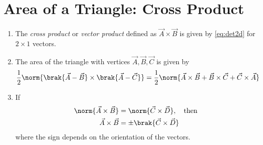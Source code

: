\section{Area of a Triangle: Cross Product}
\begin{enumerate}[label=\thesection.\arabic*.,ref=\thesection.\theenumi]
\item The {\em cross product} or {\em vector product} defined as $\vec{A}\times \vec{B}$ is given by  
  \eqref{eq:det2d} for  $2 \times 1$ vectors.
\item The area of the triangle with vertices $\vec{A}, \vec{B}, \vec{C}$ is given by 
	\label{prop:area2d}
\begin{align}
  \label{eq:area2d}
	\frac{1}{2}\norm{\brak{\vec{A}-\vec{B}} \times \brak{\vec{A}-\vec{C}}}
 = 
 \frac{1}{2}\norm{\vec{A} \times \vec{B}+\vec{B} \times \vec{C}+\vec{C} \times \vec{A}}
  \end{align}
  \item If 
  \label{prop:area2d-norm}
\begin{align}
  \label{eq:area2d-norm}
	\norm{\vec{A}\times\vec{B}}  &= \norm{\vec{C}\times \vec{D}}, \quad \text{then}
	\\
	\vec{A}\times\vec{B}  &= \pm\brak{\vec{C}\times \vec{D}}
  \end{align}
  where the sign depends on the orientation of the vectors.
\end{enumerate}
